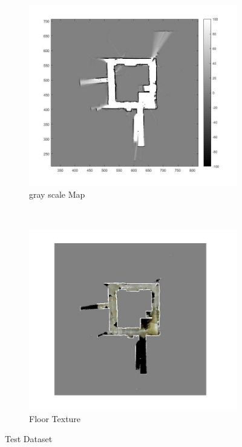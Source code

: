 \documentclass[fleqn,10pt]{SelfArx} %
\begin{document}
\begin{figure}
    \centering
    \begin{subfigure}[t]{0.5\textwidth}
        \centering
        \includegraphics[scale = 0.5]{test_map.jpg}
        \caption{gray scale Map}
    \end{subfigure}%
    ~ 
    \begin{subfigure}[t]{0.5\textwidth}
        \centering
        \includegraphics[scale = 0.5]{test_tm.jpg}
        \caption{Floor Texture}
    \end{subfigure}
    \caption{Test Dataset}
    \label{fig:test}
\end{figure}
\end{document}

